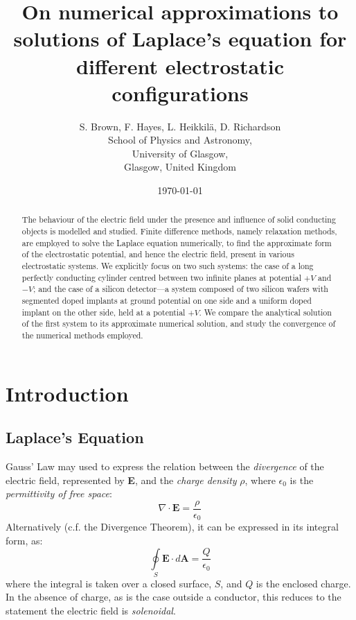 \documentclass[12pt, a4paper]{article}
\newcommand{\be}{\begin{equation}}
\newcommand{\ee}{\end{equation}}
\begin{document}
\title{On numerical approximations to solutions of Laplace's equation for different electrostatic configurations}
\author{S. Brown, F. Hayes, L. Heikkil{\"a}, D. Richardson\\
	School of Physics and Astronomy,\\
	University of Glasgow,\\
	Glasgow, United Kingdom}
\date{\today}
\maketitle

\begin{abstract}

The behaviour of the electric field under the presence and influence of solid
conducting objects is modelled and studied. Finite difference methods, namely
relaxation methods, are employed to solve the Laplace equation numerically,
to find the approximate form of the electrostatic potential, and hence the electric
field, present in various electrostatic systems.
We explicitly focus on two such systems: the case of a long perfectly conducting
cylinder centred between two infinite planes at potential $+V$ and $-V$; and the
case of a silicon detector---a system composed of two silicon wafers with segmented
doped implants at ground potential on one side and a uniform doped implant on the
other side, held at a potential $+V$. We compare the analytical solution of the first
system to its approximate numerical solution, and study the convergence of the
numerical methods employed.

\end{abstract} %

\tableofcontents

\section{Introduction}
\subsection{Laplace's Equation}

Gauss' Law may used to express the relation between the \emph{divergence} of the
electric field, represented by \textbf{E}, and the \emph{charge density} $\rho$,
where $\epsilon_0$ is the \emph{permittivity of free space}:
%
\be
\nabla \cdot \bm{E} = \frac{\rho}{\epsilon_0}
\ee
%
Alternatively (c.f. the Divergence Theorem), it can be expressed in its
integral form, as:
%
\be
\oint \limits_S \bm{E} \cdot d\bm{A} = \frac{Q}{\epsilon_0}
\ee
%
where the integral is taken over a closed surface, $S$, and $Q$ is the enclosed charge.
In the absence of charge, as is the case outside a conductor, this reduces to the
statement the electric field is \emph{solenoidal}.
\end{document}
